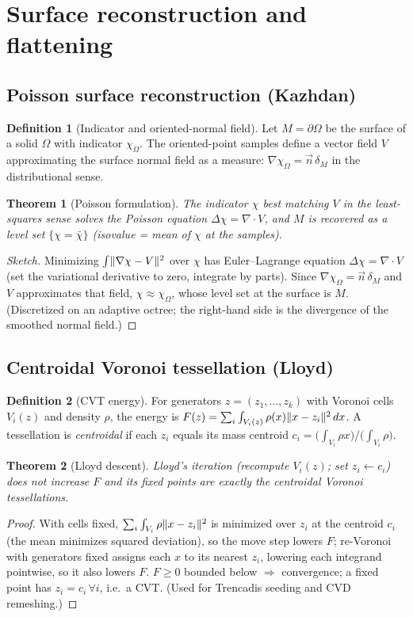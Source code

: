 \documentclass[11pt]{article}
\theoremstyle{definition}\newtheorem{definition}{Definition}[section]
\theoremstyle{plain}\newtheorem{theorem}{Theorem}[section]
\begin{document}
\section{Surface reconstruction and flattening}
\subsection{Poisson surface reconstruction (Kazhdan)}
\begin{definition}[Indicator and oriented-normal field]
Let $M=\partial\Omega$ be the surface of a solid $\Omega$ with indicator $\chi_\Omega$. The oriented-point
samples define a vector field $V$ approximating the surface normal field as a measure: $\nabla\chi_\Omega=\vec
n\,\delta_M$ in the distributional sense.
\end{definition}
\begin{theorem}[Poisson formulation]\label{thm:poisson}
The indicator $\chi$ best matching $V$ in the least-squares sense solves the Poisson equation
$\Delta\chi=\nabla\cdot V$, and $M$ is recovered as a level set $\{\chi=\bar\chi\}$ (isovalue = mean of $\chi$
at the samples).
\end{theorem}
\begin{proof}[Sketch]
Minimizing $\int\lVert \nabla\chi-V\rVert^2$ over $\chi$ has Euler--Lagrange equation $\Delta\chi=\nabla\cdot V$ (set
the variational derivative to zero, integrate by parts). Since $\nabla\chi_\Omega=\vec n\,\delta_M$ and $V$
approximates that field, $\chi\approx\chi_\Omega$, whose level set at the surface is $M$. (Discretized on an
adaptive octree; the right-hand side is the divergence of the smoothed normal field.)
\end{proof}

\subsection{Centroidal Voronoi tessellation (Lloyd)}
\begin{definition}[CVT energy]
For generators $z=(z_1,\dots,z_k)$ with Voronoi cells $V_i(z)$ and density $\rho$, the energy is
$F(z)=\sum_i\int_{V_i(z)}\rho(x)\lVert x-z_i\rVert^2\,dx$. A tessellation is \emph{centroidal} if each $z_i$ equals
its mass centroid $c_i=\big(\int_{V_i}\rho x\big)/\big(\int_{V_i}\rho\big)$.
\end{definition}
\begin{theorem}[Lloyd descent]
Lloyd's iteration (recompute $V_i(z)$; set $z_i\leftarrow c_i$) does not increase $F$ and its fixed points are
exactly the centroidal Voronoi tessellations.
\end{theorem}
\begin{proof}
With cells fixed, $\sum_i\int_{V_i}\rho\lVert x-z_i\rVert^2$ is minimized over $z_i$ at the centroid $c_i$ (the
mean minimizes squared deviation), so the move step lowers $F$; re-Voronoi with generators fixed assigns each
$x$ to its nearest $z_i$, lowering each integrand pointwise, so it also lowers $F$. $F\ge0$ bounded below
$\Rightarrow$ convergence; a fixed point has $z_i=c_i\,\forall i$, i.e.\ a CVT. (Used for Trencadis seeding and
CVD remeshing.)
\end{proof}
\end{document}
